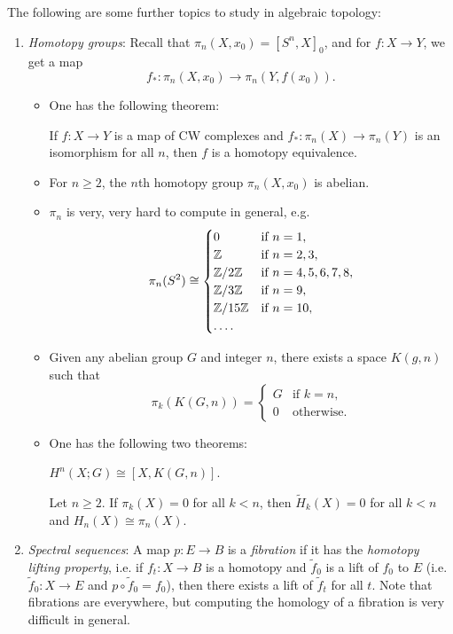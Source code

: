 The following are some further topics to
study in algebraic topology:
\begin{enumerate}
  \item \emph{Homotopy groups}: Recall that
    $\pi_n(X, x_0) = [S^n, X]_0$, and
    for $f : X \to Y$, we get a map
    \[f_* : \pi_n(X, x_0) \to \pi_n(Y, f(x_0)).\]
    \begin{itemize}
      \item One has the following theorem:
        \begin{theorem}[Whitehead]
          If $f : X \to Y$ is a map of
          CW complexes and $f_* : \pi_n(X) \to \pi_n(Y)$
          is an isomorphism for all $n$,
          then $f$ is a homotopy equivalence.
        \end{theorem}
      \item For $n \ge 2$, the $n$th
        homotopy
        group $\pi_n(X, x_0)$ is abelian.
      \item $\pi_n$ is very, very hard
        to compute in general, e.g.
        \[
          \pi_n(S^2) \cong
          \begin{cases}
            0 & \text{if $n = 1$}, \\
            \mathbb{Z} & \text{if $n = 2, 3$}, \\
            \mathbb{Z} / 2\mathbb{Z} & \text{if $n = 4, 5, 6, 7, 8$}, \\
            \mathbb{Z} / 3\mathbb{Z} & \text{if $n = 9$}, \\
            \mathbb{Z} / 15\mathbb{Z} & \text{if $n = 10$}, \\
            \dots.
          \end{cases}
        \]
      \item Given any abelian group $G$
        and integer $n$, there exists a
        space $K(g, n)$ such that
        \[
          \pi_k(K(G, n)) =
          \begin{cases}
            G & \text{if $k = n$}, \\
            0 & \text{otherwise}.
          \end{cases}
        \]
      \item One has the following two theorems:
        \begin{theorem}[Brown]
          $H^n(X; G) \cong [X, K(G, n)]$.
        \end{theorem}

        \begin{theorem}[Hurewicz]
          Let $n \ge 2$.
          If $\pi_k(X) = 0$ for all
          $k < n$, then
          $\widetilde{H}_k(X) = 0$ for all
          $k < n$ and $H_n(X) \cong \pi_n(X)$.
        \end{theorem}
    \end{itemize}
  \item \emph{Spectral sequences}:
    A map $p : E \to B$ is a \emph{fibration}
    if it has the \emph{homotopy lifting property}, i.e. if
    $f_t : X \to B$ is a homotopy and
    $\widetilde{f}_0$ is a lift of
    $f_0$ to $E$ (i.e. $\widetilde{f}_0 : X \to E$
    and $p \circ \widetilde{f}_0 = f_0$),
    then there exists a lift of
    $\widetilde{f}_t$ for all $t$.
    Note that fibrations are everywhere,
    but computing the homology of a
    fibration is very difficult in general.


\end{enumerate}
